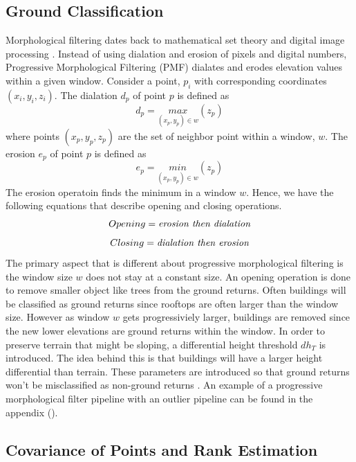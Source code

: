 \documentclass[11pt]{article}
\theoremstyle{definition}
\begin{document}
\subsection{Ground Classification}\label{sub:ground}
Morphological filtering dates back to mathematical set theory and digital image processing \cite{zhang2003progressive}.  Instead of using dialation and erosion of pixels and digital numbers, Progressive Morphological Filtering (PMF) dialates and erodes elevation values within a given window.  Consider a point, $p_i$ with corresponding coordinates $(x_i,y_i,z_i)$.  The dialation $d_{p}$ of point $p$ is defined as 
\begin{equation}\label{eqn:dialation}
d_{p}=\underset{(x_{p},y_{p})\in w}{max} (z_{p})
\end{equation}
where points $(x_{p},y_{p},z_{p})$ are the set of neighbor point within a window, $w$.  The erosion $e_p$ of point $p$ is defined as 
\begin{equation}\label{eqn:erosion}
e_{p}=\underset{(x_{p},y_{p})\in w}{min} (z_{p})
\end{equation}
The erosion operatoin finds the minimum in a window $w$.  Hence, we have the following equations that describe opening and closing operations.  
\begin{equation}\label{eqn:opening}
Opening=\text{\textit{erosion then dialation}}
\end{equation}
\begin{equation}\label{eqn:closing}
Closing=\text{\textit{dialation then erosion}}
\end{equation}
The primary aspect that is different about progressive morphological filtering is the window size $w$ does not stay at a constant size.  An opening operation is done to remove smaller object like trees from the ground returns.  Often buildings will be classified as ground returns since rooftops are often larger than the window size.  However as window $w$ gets progressiviely larger, buildings are removed since the new lower elevations are ground returns within the window.  In order to preserve terrain that might be sloping, a differential height threshold $dh_T$ is introduced.  The idea behind this is that buildings will have a larger height differential than terrain.  These parameters are introduced so that ground returns won't be misclassified as non-ground returns \cite{zhang2003progressive}.  An example of a progressive morphological filter pipeline with an outlier pipeline can be found in the appendix ().
\subsection{Covariance of Points and Rank Estimation}\label{sub:Cov_Rank}
\end{document}
